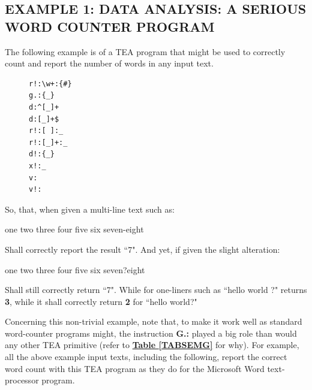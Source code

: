 \documentclass[a4paper, 18pt]{book} %
\begin{document}
\subsection{EXAMPLE 1: \textbf{DATA ANALYSIS:} A SERIOUS WORD COUNTER PROGRAM}
\label{SECEXAMP1G}

The following example is of a TEA program that might be used to correctly count and report the number of words in any input text. 


 \begin{figure}[H]
 \Large
  \centering
  \begin{tcolorbox}[teaterminalstyle, title=TEA Program: SERIOUS WORD COUNTER]
  \begin{lstlisting}[language=TEA]
r!:\w+:{#} 
g.:{_} 
d:^[_]+ 
d:[_]+$ 
r!:[ ]:_ 
r!:[_]+:_ 
d!:{_} 
x!:_
v: 
v!:
   \end{lstlisting}
  \end{tcolorbox}
  \label{FIGG1}
\end{figure}


So, that, when given a multi-line text such as:



  \begin{tcbverbatim}[title=Sample Input Text 1]
one two three
four
five six seven-eight
  \end{tcbverbatim}


Shall correctly report the result ``7". And yet, if given the slight alteration:





  \begin{tcbverbatim}[title=Sample Input Text 2]
one two three
four
five six seven?eight
  \end{tcbverbatim}



Shall still correctly return ``7". While for one-liners such as ``hello world ?" returns \textbf{3}, while it shall correctly return \textbf{2} for ``hello world?"

Concerning this non-trivial example, note that, to make it work well as standard word-counter programs might, the instruction  \textbf{G.:} played a big role than would any other TEA primitive (refer to \textbf{\hyperref[TABSEMG]{Table \ref{TABSEMG}}} for why). For example, all the above example input texts, including the following, report the correct word count with this TEA program as they do for the Microsoft Word text-processor program.
\end{document}
